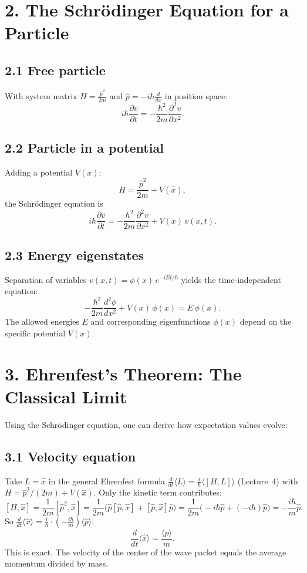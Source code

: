 \documentclass[12pt,a4paper]{article}
\begin{document}
\section{2. The Schr\"{o}dinger Equation for a Particle}

\subsection{2.1 Free particle}
With system matrix $H = \frac{\hat{p}^2}{2m}$ and $\hat{p}=-i\hbar\frac{d}{dx}$ in position space:
\[
    \boxed{i\hbar\frac{\partial v}{\partial t} = -\frac{\hbar^2}{2m}\frac{\partial^2 v}{\partial x^2}.}
\]

\subsection{2.2 Particle in a potential}
Adding a potential $V(x)$:
\[
    H = \frac{\hat{p}^2}{2m} + V(\hat{x}),
\]
the Schr\"{o}dinger equation is
\[
    \boxed{i\hbar\frac{\partial v}{\partial t} = -\frac{\hbar^2}{2m}\frac{\partial^2 v}{\partial x^2} + V(x)\,v(x,t).}
\]

\subsection{2.3 Energy eigenstates}
Separation of variables $v(x,t)=\phi(x)\,e^{-iEt/\hbar}$ yields the time-independent equation:
\[
    -\frac{\hbar^2}{2m}\frac{d^2\phi}{dx^2} + V(x)\,\phi(x) = E\,\phi(x).
\]
The allowed energies $E$ and corresponding eigenfunctions $\phi(x)$ depend on the specific potential $V(x)$.

\section{3. Ehrenfest's Theorem: The Classical Limit}

Using the Schr\"odinger equation, one can derive how expectation values evolve:

\subsection{3.1 Velocity equation}
Take $L = \hat{x}$ in the general Ehrenfest formula $\frac{d}{dt}\langle L\rangle = \frac{i}{\hbar}\langle[H,L]\rangle$ (Lecture~4) with $H = \hat{p}^2/(2m)+V(\hat{x})$.  Only the kinetic term contributes:
\[
    [H,\hat{x}] = \frac{1}{2m}[\hat{p}^2,\hat{x}]
    = \frac{1}{2m}\bigl(\hat{p}[\hat{p},\hat{x}]+[\hat{p},\hat{x}]\hat{p}\bigr)
    = \frac{1}{2m}\bigl(-i\hbar\hat{p}+(-i\hbar)\hat{p}\bigr)
    = -\frac{i\hbar}{m}\hat{p}.
\]
So $\frac{d}{dt}\langle\hat{x}\rangle = \frac{i}{\hbar}\cdot(-\frac{i\hbar}{m})\langle\hat{p}\rangle$:
\[
    \boxed{\frac{d}{dt}\langle \hat{x} \rangle = \frac{\langle \hat{p} \rangle}{m}.}
\]
This is exact.  The velocity of the center of the wave packet equals the average momentum divided by mass.
\end{document}
